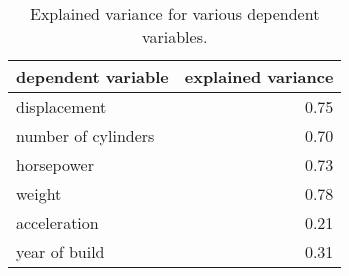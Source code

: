 \begin{table}
  \centering
  \begin{tabular}{|l|r|}
  \hline
  dependent variable  & explained variance   \\
  \hline
  \hline
  displacement        & 0.75                 \\
  \hline
  number of cylinders & 0.70                 \\
  \hline
  horsepower          & 0.73                 \\
  \hline
  weight              & 0.78                 \\
  \hline
  acceleration        & 0.21                 \\
  \hline
  year of build       & 0.31                 \\
  \hline
  \end{tabular}
  \caption[explained variance]{Explained variance for various dependent variables.}
  \label{tab:explained-variance}
\end{table}

